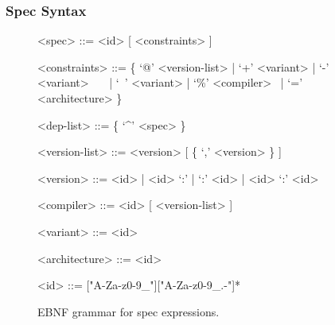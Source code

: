 \subsubsection{Spec Syntax}\label{sec:syntax}
\begin{figure}
{\selectfont
\begin{grammar}\small
  <spec>         ::= <id> [ <constraints> ]

  <constraints>   ::= \{ `@' <version-list> | `+' <variant> \newline
                   | `-' <variant> ~~~| `~' <variant> \newline
                   | `\%' <compiler> ~| `=' <architecture> \} 

  <dep-list>  ::= \{ `\textsf \textasciicircum' <spec> \}

  <version-list> ::= <version> [ \{ `,' <version> \} ]

  <version>      ::= <id> | <id> `:' | `:' <id> | <id> `:' <id>

  <compiler>     ::= <id> [ <version-list> ]

  <variant>      ::= <id>

  <architecture> ::= <id>

  <id>           ::= ["A-Za-z0-9_"]["A-Za-z0-9_.-"]*
\end{grammar}
} %
\caption{
	EBNF grammar for spec expressions.
	\label{fig:grammar}
}
\end{figure}


